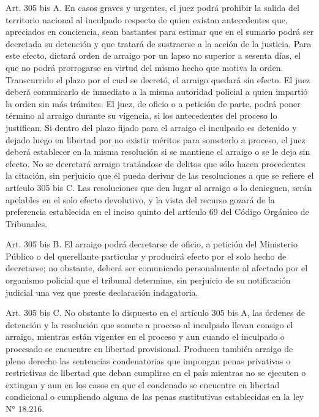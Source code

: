     Art. 305 bis A. En casos graves y urgentes, el juez podrá prohibir la salida del territorio nacional al inculpado respecto de quien existan antecedentes que, apreciados en conciencia, sean bastantes para estimar que en el sumario podrá ser decretada su detención y que tratará de sustraerse a la acción de la justicia.
    Para este efecto, dictará orden de arraigo por un lapso no superior a sesenta días, el que no podrá prorrogarse en virtud del mismo hecho que motiva la orden. Transcurrido el plazo por el cual se decretó, el arraigo quedará sin efecto. El juez deberá comunicarlo de inmediato a la misma autoridad policial a quien impartió la orden sin más trámites.
    El juez, de oficio o a petición de parte, podrá poner término al arraigo durante su vigencia, si los antecedentes del proceso lo justifican.
    Si dentro del plazo fijado para el arraigo el inculpado es detenido y dejado luego en libertad por no existir méritos para someterlo a proceso, el juez deberá establecer en la misma resolución si se mantiene el arraigo o se le deja sin efecto.
    No se decretará arraigo tratándose de delitos que sólo hacen procedentes la citación, sin perjuicio que él pueda derivar de las resoluciones a que se refiere el artículo 305 bis C.
    Las resoluciones que den lugar al arraigo o lo denieguen, serán apelables en el solo efecto devolutivo, y la vista del recurso gozará de la preferencia establecida en el inciso quinto del artículo 69 del Código Orgánico de Tribunales.

    Art. 305 bis B. El arraigo podrá decretarse de oficio, a petición del Ministerio Público o del querellante particular y producirá efecto por el solo hecho de decretarse; no obstante, deberá ser comunicado personalmente al afectado por el organismo policial que el tribunal determine, sin perjuicio de su notificación judicial una vez que preste declaración indagatoria.

    Art. 305 bis C. No obstante lo dispuesto en el artículo 305 bis A, las órdenes de detención y la resolución que somete a proceso al inculpado llevan consigo el arraigo, mientras están vigentes en el proceso y aun cuando el inculpado o procesado se encuentre en libertad provisional.
    Producen también arraigo de pleno derecho las sentencias condenatorias que impongan penas privativas o restrictivas de libertad que deban cumplirse en el país mientras no se ejecuten o extingan y aun en los casos en que el condenado se encuentre en libertad condicional o cumpliendo alguna de las penas sustitutivas establecidas en la ley N° 18.216.




